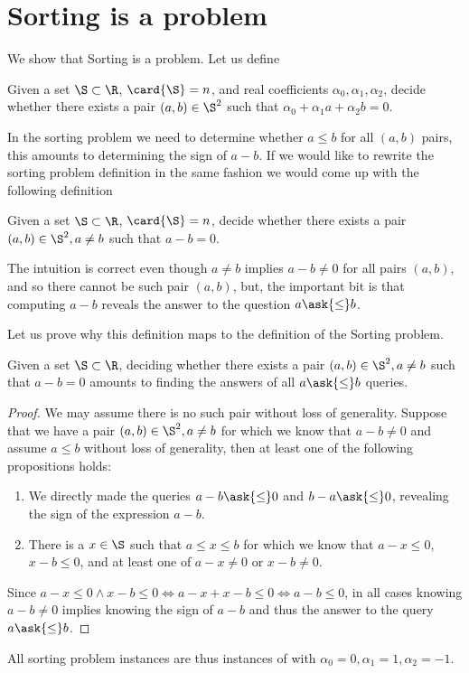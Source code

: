 \section{Sorting is a \twoLDT problem}

We show that Sorting is a \twoLDT problem. Let us define \twoLDT
\begin{problem}[\twoLDT]
Given a set $\S \subset \R$, $\card{\S} = n$, and real coefficients $\alpha_0,
\alpha_1, \alpha_2$, decide whether there exists a pair $(a,b) \in \S^2$ such that
$\alpha_0 + \alpha_1 a + \alpha_2 b = 0$.
\end{problem}

In the sorting problem we need to determine whether $a \le b$ for all $(a,b)$
pairs, this amounts to determining the sign of $a-b$. If we would like to rewrite
the sorting problem definition in the same fashion we would come up with the
following definition
\begin{problem}
Given a set $\S \subset \R$, $\card{\S} = n$, decide whether there exists a
pair $(a,b) \in \S^2, a \neq b$ such that $a - b = 0$.
\end{problem}

The intuition is correct even though $a \neq b$ implies $a-b \neq 0$ for all
pairs \((a,b)\), and so there cannot be such pair \((a,b)\), but, the important
bit is that computing $a-b$ reveals the answer to the question $a \ask{\le} b$.

Let us prove why this definition maps to the definition of the Sorting problem.
\begin{theorem}\label{thm:related:sorting}
Given a set \(\S \subset \R\), deciding whether there exists a pair \((a,b)
\in \S^2, a \neq b\) such that \(a - b = 0\) amounts to finding the answers of all \(a
\ask{\le} b\) queries.
\end{theorem}
\begin{proof}
We may assume there is no such pair without loss of generality.
Suppose that we have a pair \((a,b) \in \S^2, a \neq b\) for which we
know that \(a - b \neq 0\) and assume \(a \le b\) without loss of generality,
then at least one of the following propositions holds:
\begin{enumerate}
\item We directly made the queries \(a - b
\ask{\le} 0\) and \(b - a \ask{\le} 0\), revealing the sign of the expression
\(a - b\).
\item There is a \(x \in \S\) such that \(a \le x \le b\) for which we
know that \(a - x \le 0\), \(x - b \le 0\), and at least one of \(a - x \neq
0\) or \(x - b \neq 0\).
\end{enumerate}
Since \(a - x \le 0 \land x - b \le 0 \iff a - x + x - b \le 0 \iff a - b \le
0\), in all cases knowing \(a - b \neq 0\) implies knowing the sign of \(a -
b\) and thus the answer to the query \(a \ask{\le} b\).
\end{proof}

All sorting problem instances are thus instances of \twoLDT with
$\alpha_0 = 0, \alpha_1 = 1, \alpha_2 = -1$.
